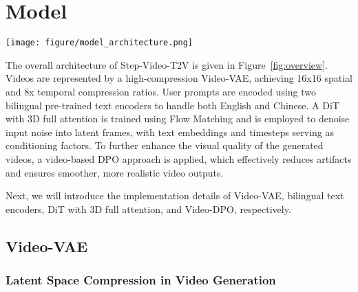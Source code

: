 \section{Model}

\begin{figure*}[t]
    \centering
    \texttt{[image: figure/model\_architecture.png]}
    \caption{Architecture overview of Step-Video-T2V. Videos are represented by a high-compression Video-VAE, achieving 16x16 spatial and 8x temporal compression ratios. User prompts are encoded using two bilingual pre-trained text encoders to handle both English and Chinese. A DiT with 3D full attention is trained using Flow Matching and is employed to denoise input noise into latent frames, with text embeddings and timesteps serving as conditioning factors. To further enhance the visual quality of the generated videos, a video-based DPO approach is applied, which effectively reduces artifacts and ensures smoother, more realistic video outputs.}
    \label{fig:overview}
\end{figure*}


The overall architecture of Step-Video-T2V is given in Figure~\ref{fig:overview}. Videos are represented by a high-compression Video-VAE, achieving 16x16 spatial and 8x temporal compression ratios. User prompts are encoded using two bilingual pre-trained text encoders to handle both English and Chinese. A DiT with 3D full attention is trained using Flow Matching \citep{lipman2023flowmatchinggenerativemodeling} and is employed to denoise input noise into latent frames, with text embeddings and timesteps serving as conditioning factors. To further enhance the visual quality of the generated videos, a video-based DPO approach is applied, which effectively reduces artifacts and ensures smoother, more realistic video outputs.

Next, we will introduce the implementation details of Video-VAE, bilingual text encoders, DiT with 3D full attention, and Video-DPO, respectively.



\subsection{Video-VAE}
\subsubsection{Latent Space Compression in Video Generation}



